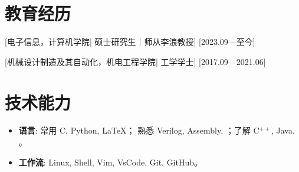 \documentclass{resume}
\begin{document}


\ResumeTitle

\section[教育经历]{教育经历}
[\textnormal{电子信息，计算机学院|}  硕士研究生｜师从李浪教授]
[2023.09—至今]

[\textnormal{机械设计制造及其自动化，机电工程学院|} 工学学士]
[2017.09—2021.06]

\section[技术能力]{技术能力\protect}
\begin{itemize}
  \item \textbf{语言}: 常用 C, Python, \LaTeX； 熟悉 Verilog, Assembly, ；了解 C$^{++}$, Java, 。
  \item \textbf{工作流}: Linux, Shell, Vim, VsCode,  Git, GitHub。
\end{itemize}



\end{document}

